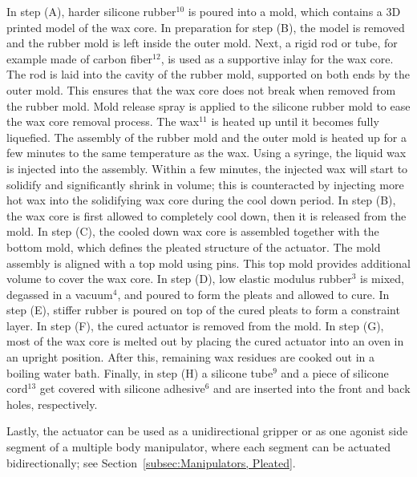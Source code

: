 In step (A), harder silicone rubber$^{10}$ is poured into a mold, which contains a 3D printed model of the wax core.
In preparation for step (B), the model is removed and the rubber mold is left inside the outer mold.
Next, a rigid rod or tube, for example made of carbon fiber$^{12}$, is used as a supportive inlay for the wax core.
The rod is laid into the cavity of the rubber mold, supported on both ends by the outer mold.
This ensures that the wax core does not break when removed from the rubber mold.
Mold release spray is applied to the silicone rubber mold to ease the wax core removal process.
The wax$^{11}$ is heated up until it becomes fully liquefied.
The assembly of the rubber mold and the outer mold is heated up for a few minutes to the same temperature as the wax.
Using a syringe, the liquid wax is injected into the assembly.
Within a few minutes, the injected wax will start to solidify and significantly shrink in volume; this is counteracted by injecting more hot wax into the solidifying wax core during the cool down period.
In step (B), the wax core is first allowed to completely cool down, then it is released from the mold.
In step (C), the cooled down wax core is assembled together with the bottom mold, which defines the pleated structure of the actuator.
The mold assembly is aligned with a top mold using pins. This top mold provides additional volume to cover the wax core.
In step (D), low elastic modulus rubber$^3$ is mixed, degassed in a vacuum$^4$, and poured to form the pleats and allowed to cure.
In step (E), stiffer rubber is poured on top of the cured pleats to form a constraint layer.
In step (F), the cured actuator is removed from the mold.
In step (G), most of the wax core is melted out by placing the cured actuator into an oven in an upright position.
After this, remaining wax residues are cooked out in a boiling water bath.
Finally, in step (H) a silicone tube$^9$ and a piece of silicone cord$^13$ get covered with silicone adhesive$^6$ and are inserted into the front and back holes, respectively.

Lastly, the actuator can be used as a unidirectional gripper or as one agonist side segment of a multiple body manipulator, where each segment can be actuated bidirectionally; see Section~\ref{subsec:Manipulators, Pleated}.

